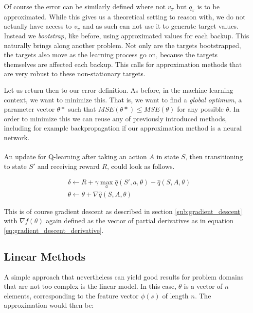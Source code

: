Of course the error can be similarly defined
where not $v_\pi$ but $q_\pi$ is to be approximated.
While this gives us a theoretical setting to reason with,
we do not actually have access to $v_\pi$
and as such can not use it to generate target values.
Instead we \textit{bootstrap}, like before,
using approximated values for each backup.
This naturally brings along another problem.
Not only are the targets bootstrapped,
the targets also move as the learning process go on,
because the targets themselves are affected each backup.
This calls for approximation methods that
are very robust to these non-stationary targets.

Let us return then to our error definition.
As before, in the machine learning context,
we want to minimize this.
That is, we want to find a \textit{global optimum},
a parameter vector $\theta*$
such that $MSE(\theta*) \leq MSE(\theta)$ for any possible $\theta$.
In order to minimize this we can reuse any of previously introduced methods,
including for example backpropagation
if our approximation method is a neural network.

\paragraph{}
An update for Q-learning
after taking an action $A$ in state $S$,
then transitioning to state $S'$ and receiving reward $R$,
could look as follows.

\begin{align*}
  &\delta \gets R + \gamma \max_a \hat{q}(S', a, \theta) - \hat{q}(S, A, \theta) \\
  &\theta \gets \theta + \nabla \hat{q}(S, A, \theta)
\end{align*}

This is of course gradient descent
as described in section \ref{sub:gradient_descent}
with $\nabla f(\theta)$
again defined as the vector of partial derivatives
as in equation \ref{eq:gradient_descent_derivative}.

\subsection{Linear Methods}
\label{sub:linear_methods}
A simple approach that nevertheless can yield good results
for problem domains that are not too complex
is the linear model.
In this case, $\theta$ is a vector of $n$ elements,
corresponding to the feature vector $\phi(s)$ of length $n$.
The approximation would then be:

